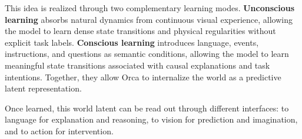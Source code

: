 This idea is realized through two complementary learning modes. \textbf{Unconscious learning} absorbs natural dynamics from continuous visual experience, allowing the model to learn dense state transitions and physical regularities without explicit task labels. \textbf{Conscious learning} introduces language, events, instructions, and questions as semantic conditions, allowing the model to learn meaningful state transitions associated with causal explanations and task intentions. Together, they allow Orca to internalize the world as a predictive latent representation.

Once learned, this world latent can be read out through different interfaces: to language for explanation and reasoning, to vision for prediction and imagination, and to action for intervention.

